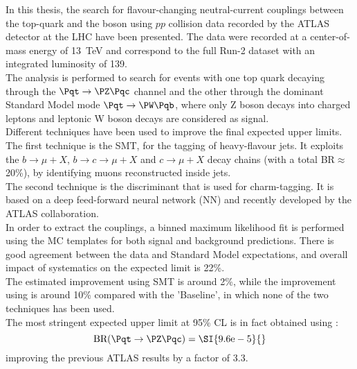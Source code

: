 In this thesis, the search for flavour-changing neutral-current 
couplings between the top-quark and the \PZ boson using $pp$ collision 
data recorded by the ATLAS detector at the LHC have been presented.
The data were recorded at a center-of-mass energy of \SI{13}{\TeV} and correspond to the full Run-2 dataset with an integrated luminosity of \SI{139}{\ifb}. \\
The analysis is performed to search for \ttbar events with one top quark decaying through the $\Pqt\rightarrow\PZ\Pqc$ channel and the other through the dominant Standard Model mode $\Pqt\rightarrow\PW\Pqb$, where only Z boson decays into charged leptons and leptonic W boson decays are considered as signal.\\
Different techniques have been used to improve the final expected upper limits.
\vspace{\baselineskip}
\\The first technique is the SMT, for the tagging of heavy-flavour jets. It exploits the $b \rightarrow \mu + X$, $b \rightarrow c \rightarrow \mu + X$ and $c \rightarrow \mu + X$ decay chains (with a total BR$\approx$ 20\%), by identifying muons reconstructed inside jets. 
\vspace{\baselineskip}
\\The second technique is the \DLrc discriminant that is used for charm-tagging. It is based on a deep feed-forward neural network (NN) and recently developed by the ATLAS collaboration.
\vspace{\baselineskip}
\\In order to extract the \tZc couplings, a binned maximum likelihood fit is performed using the MC templates for both signal and background predictions.
There is good agreement between the data and Standard
Model expectations, and overall impact of systematics on the expected limit is 22\%.\\
The estimated improvement using SMT is around 2\%, while the improvement using \DLrc is around 10\% compared with the 'Baseline', in which none of the two techniques has been used.\\
The most stringent expected upper limit at 95\% CL is in fact obtained using \DLrc:
\begin{equation*}
\mathrm{BR (\Pqt\rightarrow\PZ\Pqc)=\SI{9.6e-5}{}}
\end{equation*}
improving the previous ATLAS results by a factor of 3.3.
